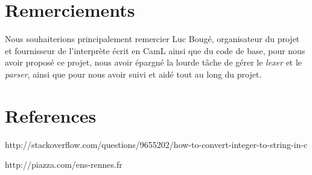 \documentclass[a4paper,11pt]{article}
\begin{document}
\section{Remerciements}
	Nous souhaiterions principalement remercier Luc Bougé, organisateur du projet et fournisseur de l'interprète écrit en CamL ainsi que du code de base, pour nous avoir proposé ce projet, nous avoir épargné la lourde tâche de gérer le \textit{lexer} et le \textit{parser}, ainsi que pour nous avoir suivi et aidé tout au long du projet.
	
\section{References}
http://stackoverflow.com/questions/9655202/how-to-convert-integer-to-string-in-c


http://piazza.com/ens-rennes.fr
\end{document}

